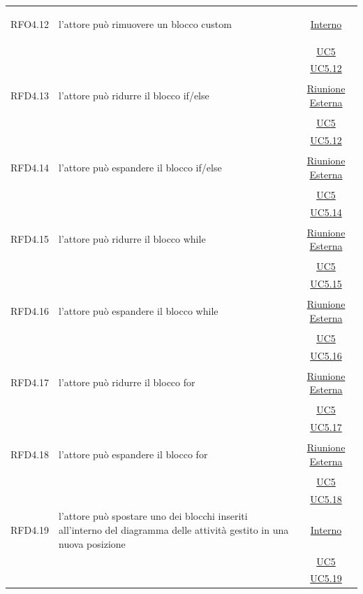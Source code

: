 \begin{longtable}{|c|>{\centering}m{7cm}|c|}
\hypertarget{RFO4.12}{RFO4.12} & l'attore può rimuovere un blocco custom & \hyperlink{Interno}{Interno}\\
& &\hyperref[UC5]{UC5}\\
& &\hyperref[UC5.12]{UC5.12}\\ \hline

\hypertarget{RFD4.13}{RFD4.13} & l'attore può ridurre il blocco if/else & \hyperlink{Riunione Esterna}{Riunione Esterna}\\
& &\hyperref[UC5]{UC5}\\
& &\hyperref[UC5.12]{UC5.12}\\ \hline

\hypertarget{RFD4.14}{RFD4.14} & l'attore può espandere il blocco if/else & \hyperlink{Riunione Esterna}{Riunione Esterna}\\
& &\hyperref[UC5]{UC5}\\
& &\hyperref[UC5.14]{UC5.14}\\ \hline

\hypertarget{RFD4.15}{RFD4.15} & l'attore può ridurre il blocco while & \hyperlink{Riunione Esterna}{Riunione Esterna}\\
& &\hyperref[UC5]{UC5}\\
& &\hyperref[UC5.15]{UC5.15}\\ \hline

\hypertarget{RFD4.16}{RFD4.16} & l'attore può espandere il blocco while & \hyperlink{Riunione Esterna}{Riunione Esterna}\\
& &\hyperref[UC5]{UC5}\\
& &\hyperref[UC5.16]{UC5.16}\\ \hline

\hypertarget{RFD4.17}{RFD4.17} & l'attore può ridurre il blocco for & \hyperlink{Riunione Esterna}{Riunione Esterna}\\
& &\hyperref[UC5]{UC5}\\
& & \hyperref[UC5.17]{UC5.17}\\ \hline

\hypertarget{RFD4.18}{RFD4.18} & l'attore può espandere il blocco for &  \hyperlink{Riunione Esterna}{Riunione Esterna}\\
& &\hyperref[UC5]{UC5}\\
& &\hyperref[UC5.18]{UC5.18}\\ \hline

\hypertarget{RFD4.19}{RFD4.19} & l'attore può spostare uno dei blocchi inseriti all'interno del diagramma delle attività gestito in una nuova posizione &  \hyperlink{Interno}{Interno}\\
& &\hyperref[UC5]{UC5}\\
& &\hyperref[UC5.19]{UC5.19}\\ \hline


\end{longtable}
